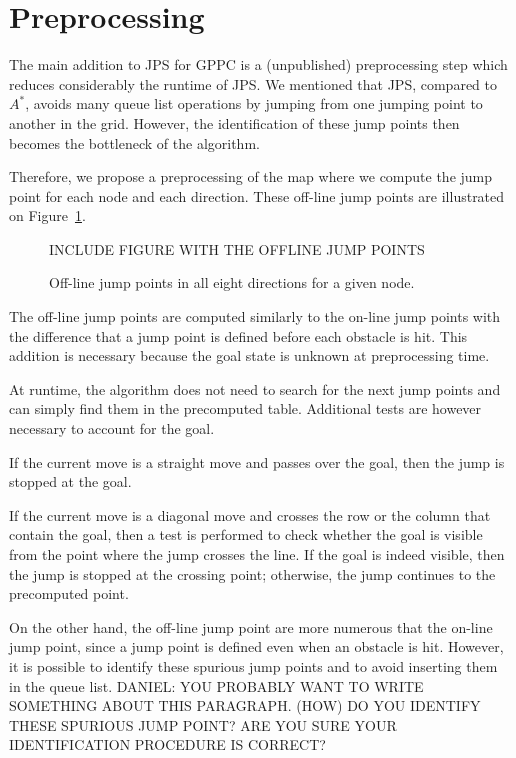 \section{Preprocessing}
\label{sec::pre}

The main addition to JPS for GPPC is a (unpublished) preprocessing step 
which reduces considerably the runtime of JPS.  
We mentioned that JPS, compared to $A^*$, 
avoids many queue list operations 
by jumping from one jumping point to another in the grid.  
However, the identification of these jump points 
then becomes the bottleneck of the algorithm.  

Therefore, we propose a preprocessing of the map 
where we compute the jump point 
for each node and each direction.  
These off-line jump points are illustrated on Figure~\ref{fig::ojp}.  

\begin{figure}[ht]
  INCLUDE FIGURE WITH THE OFFLINE JUMP POINTS
  \caption{Off-line jump points in all eight directions for a given node.}
  \label{fig::ojp}
\end{figure}

The off-line jump points are computed similarly to the on-line jump points 
with the difference that a jump point is defined before each obstacle is hit.  
This addition is necessary 
because the goal state is unknown at preprocessing time.  

At runtime, the algorithm does not need to search for the next jump points 
and can simply find them in the precomputed table.  
Additional tests are however necessary to account for the goal.  

If the current move is a straight move 
and passes over the goal, 
then the jump is stopped at the goal.  

If the current move is a diagonal move 
and crosses the row or the column that contain the goal, 
then a test is performed to check 
whether the goal is visible from the point 
where the jump crosses the line.  
If the goal is indeed visible, 
then the jump is stopped at the crossing point; 
otherwise, the jump continues to the precomputed point.  

On the other hand, the off-line jump point are more numerous 
that the on-line jump point, 
since a jump point is defined even when an obstacle is hit.  
However, it is possible to identify these spurious jump points 
and to avoid inserting them in the queue list.  
DANIEL: YOU PROBABLY WANT TO WRITE SOMETHING ABOUT THIS PARAGRAPH.  
(HOW) DO YOU IDENTIFY THESE SPURIOUS JUMP POINT?  
ARE YOU SURE YOUR IDENTIFICATION PROCEDURE IS CORRECT?  

